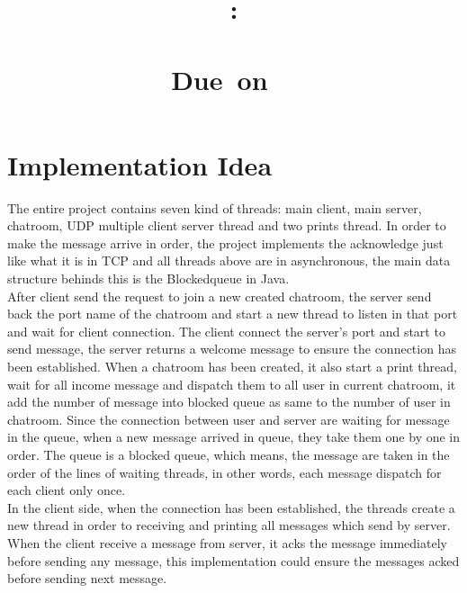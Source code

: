 \documentclass{article}
\title{
    \vspace{2in}
    \textmd{\textbf{\hmwkClass:\\\ \hmwkTitle}}\\
    \normalsize\vspace{0.1in}\small{Due\ on\ \hmwkDueDate\ }\\
    \vspace{0.1in}\large{\textit{\hmwkClassInstructor}}
    \vspace{3in}
}
\author{\textbf{\hmwkAuthorName}}
\date{}
\begin{document}
\maketitle
\newpage
\tableofcontents
\newpage
\section{Implementation Idea}
The entire project contains seven kind of threads: main client, main server, chatroom, UDP multiple client server thread and two prints thread. In order to make the message arrive in order, the project implements the acknowledge just like what it is in TCP and all  threads above are in asynchronous, the main data structure behinds this is the Blockedqueue in Java.\\

After client send the request to join a new created chatroom, the server send back the port name of the chatroom and start a new thread to listen in that port and wait for client connection. The client connect the server's port and start to send message, the server returns a welcome message to ensure the connection has been established. When a chatroom has been created, it also start a print thread, wait for all income message and dispatch them to all user in current chatroom, it add the number of message into blocked queue as same to the number of user in chatroom. Since the connection between user and server are waiting for message in the queue, when a new message arrived in queue, they take them one by one in order. The queue is a blocked queue, which means, the message are taken in the order of the lines of waiting threads, in other words, each message dispatch for each client only once. \\

In the client side, when the connection has been established, the threads create a new thread in order to receiving and printing all messages which send by server. When the client receive a message from server, it acks the message immediately before sending any message, this implementation could ensure the messages acked before sending next message.
\clearpage 
\end{document}
